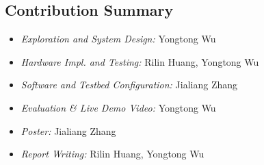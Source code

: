 \subsection{Contribution Summary}
\begin{itemize}
\item \textit{Exploration and System Design:} Yongtong Wu
\item \textit{Hardware Impl. and Testing:} Rilin Huang, Yongtong Wu
\item \textit{Software and Testbed Configuration:} Jialiang Zhang
\item \textit{Evaluation \& Live Demo Video:} Yongtong Wu
\item \textit{Poster:} Jialiang Zhang
\item \textit{Report Writing:} Rilin Huang, Yongtong Wu
\end{itemize}